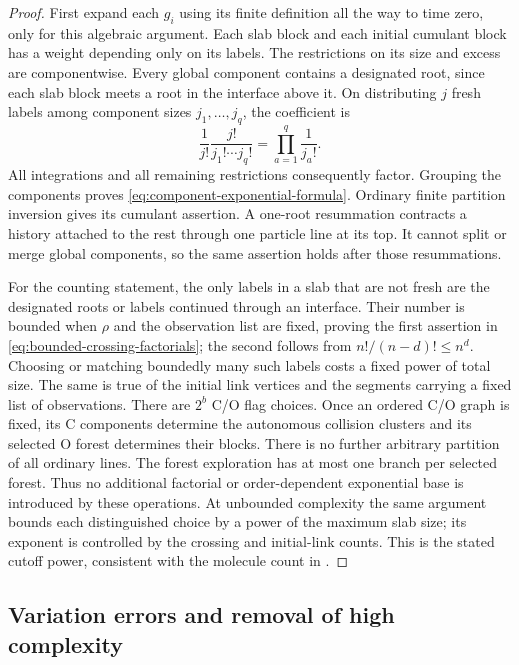 \begin{proof}
First expand each $g_i$ using its finite definition all the way to time
zero, only for this algebraic argument.  Each slab block and each
initial cumulant block has a weight depending only on its labels.
The restrictions on its size and excess are componentwise.  Every
global component contains a designated root, since each slab block
meets a root in the interface above it.  On distributing $j$ fresh
labels among component sizes $j_1,\ldots,j_q$, the coefficient is
\[
 \frac1{j!}\frac{j!}{j_1!\cdots j_q!}
                 =\prod_{a=1}^q\frac1{j_a!}.
\]
All integrations and all remaining restrictions consequently factor.
Grouping the components proves
\eqref{eq:component-exponential-formula}.  Ordinary finite partition
inversion gives its cumulant assertion.  A one-root resummation
contracts a history attached to the rest through one particle line at
its top.  It cannot split or merge global components, so the same
assertion holds after those resummations.

For the counting statement, the only labels in a slab that are not
fresh are the designated roots or labels continued through an
interface.  Their number is bounded when $\rho$ and the observation
list are fixed, proving the first assertion in
\eqref{eq:bounded-crossing-factorials}; the second follows from
$n!/(n-d)!\le n^d$.  Choosing or matching boundedly many such labels
costs a fixed power of total size.  The same is true of the initial
link vertices and the segments carrying a fixed list of observations.
There are $2^b$ C/O flag choices.  Once an ordered C/O graph is fixed,
its C components determine the autonomous collision clusters and its
selected O forest determines their blocks.  There is no further
arbitrary partition of all ordinary lines.  The forest exploration has
at most one branch per selected forest.  Thus no additional factorial
or order-dependent exponential base is introduced by these operations.
At unbounded complexity the same argument bounds each distinguished
choice by a power of the maximum slab size; its exponent is controlled
by the crossing and initial-link counts.  This is the stated cutoff
power, consistent with the molecule count in
.
\end{proof}

\subsection{Variation errors and removal of high complexity}

